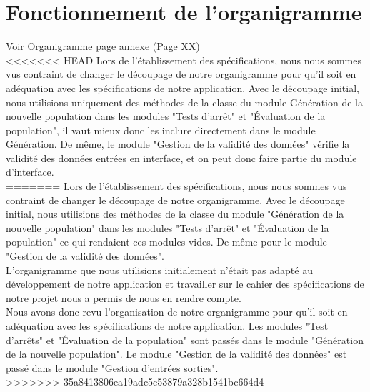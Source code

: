 \documentclass[a4paper,11pt]{article}
\begin{document}
	\section{Fonctionnement de l'organigramme}
		Voir Organigramme page annexe (Page XX)\\
<<<<<<< HEAD
		Lors de l'établissement des spécifications, nous nous sommes vus contraint de changer le découpage de notre organigramme pour qu’il soit en adéquation avec les spécifications de notre application. 
		Avec le découpage initial, nous utilisions uniquement des méthodes de la classe du module Génération de la nouvelle population dans les modules "Tests d’arrêt" et "Évaluation de la population", il vaut mieux donc les inclure directement dans le module Génération.
		De même, le module "Gestion de la validité des données" vérifie la validité des données entrées en interface, et on peut donc faire partie du module d'interface.\\
=======
		Lors de l'établissement des spécifications, nous nous sommes vus contraint de changer le découpage de notre organigramme.
		Avec le découpage initial, nous utilisions des méthodes de la classe du module "Génération de la nouvelle population" dans les modules "Tests d’arrêt" et "Évaluation de la population" ce qui rendaient ces modules vides.
		De même pour le module "Gestion de la validité des données".\\
		L’organigramme que nous utilisions initialement n’était pas adapté au développement de notre application et travailler sur le cahier des spécifications de notre projet nous a permis de nous en rendre compte.\\
		Nous avons donc revu l’organisation de notre organigramme pour qu’il soit en adéquation avec les spécifications de notre application. 
		Les modules "Test d’arrêts" et "Évaluation de la population" sont passés dans le module "Génération de la nouvelle population". Le module "Gestion de la validité des données" est passé dans le module "Gestion d'entrées sorties".\\
>>>>>>> 35a8413806ea19adc5c53879a328b1541bc664d4
		
\end{document}
